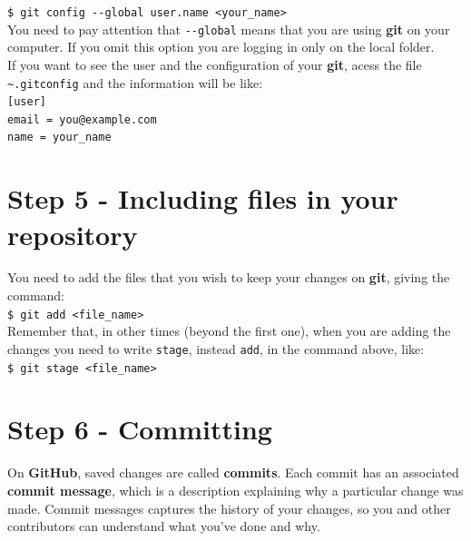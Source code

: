 \documentclass[12pt,a4paper,titlepage,brazil]{article}
\begin{document}
{\texttt{\$ git config -\hspace{0.01cm}-global user.name <your\_name>}\\

You need to pay attention that \texttt{-\hspace{0.01cm}-global} means that you are using {\bf git} on your computer. If you omit this option you are logging in only on the local folder.\\

If you want to see the user and the configuration of your {\bf git}, acess the file \texttt{\~\/.gitconfig} and the information will be like:\\

\texttt{[user]}\\

\hspace{0.5cm}\texttt{email = you@example.com}\\

\hspace{0.5cm}\texttt{name = your\_name}\\


\section{Step 5 - Including files in your repository}

You need to add the files that you wish to keep your changes on {\bf git}, giving the command:\\

\texttt{\$ git add <file\_name>}\\

Remember that, in other times (beyond the first one), when you are adding the changes you need to write \texttt{stage}, instead \texttt{add}, in the command above, like:\\

\texttt{\$ git stage <file\_name>}


\section{Step 6 - Committing}

On {\bf GitHub}, saved changes are called {\bf commits}. Each commit has an associated {\bf commit message}, which is a description explaining why a particular change was made. Commit messages captures the history of your changes, so you and other contributors can understand what you’ve done and why.\\

}
\end{document}
